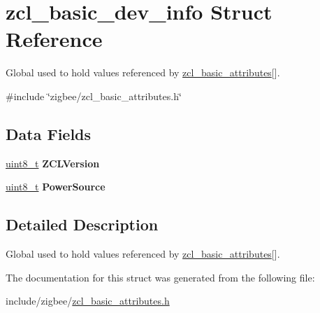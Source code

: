 \hypertarget{structzcl__basic__dev__info}{\section{zcl\-\_\-basic\-\_\-dev\-\_\-info Struct Reference}
\label{structzcl__basic__dev__info}
}


Global used to hold values referenced by \hyperlink{group__zcl__basic_ga721ebe2f6ae346632475cf178671d150}{zcl\-\_\-basic\-\_\-attributes}\mbox{[}\mbox{]}.  




{\ttfamily \#include \char`\"{}zigbee/zcl\-\_\-basic\-\_\-attributes.\-h\char`\"{}}

\subsection*{Data Fields}
\begin{DoxyCompactItemize}
\item 
\hypertarget{group__zcl__basic_ga192f747f17a619e344287c3e7f8a0dca}{\hyperlink{group__hal_gae1affc9ca37cfb624959c866a73f83c2}{uint8\-\_\-t} {\bfseries Z\-C\-L\-Version}}\label{group__zcl__basic_ga192f747f17a619e344287c3e7f8a0dca}

\item 
\hypertarget{group__zcl__basic_ga339efb8b2f6c1ed9a5269621bc7adfbb}{\hyperlink{group__hal_gae1affc9ca37cfb624959c866a73f83c2}{uint8\-\_\-t} {\bfseries Power\-Source}}\label{group__zcl__basic_ga339efb8b2f6c1ed9a5269621bc7adfbb}

\end{DoxyCompactItemize}


\subsection{Detailed Description}
Global used to hold values referenced by \hyperlink{group__zcl__basic_ga721ebe2f6ae346632475cf178671d150}{zcl\-\_\-basic\-\_\-attributes}\mbox{[}\mbox{]}. 

The documentation for this struct was generated from the following file\-:\begin{DoxyCompactItemize}
\item 
include/zigbee/\hyperlink{zcl__basic__attributes_8h}{zcl\-\_\-basic\-\_\-attributes.\-h}\end{DoxyCompactItemize}
